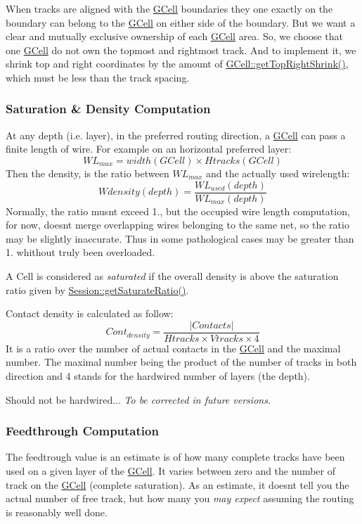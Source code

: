 When tracks are aligned with the \mbox{\hyperlink{classKatabatic_1_1GCell}{G\+Cell}} boundaries they one exactly on the boundary can belong to the \mbox{\hyperlink{classKatabatic_1_1GCell}{G\+Cell}} on either side of the boundary. But we want a clear and mutually exclusive ownership of each \mbox{\hyperlink{classKatabatic_1_1GCell}{G\+Cell}} area. So, we choose that one \mbox{\hyperlink{classKatabatic_1_1GCell}{G\+Cell}} do not own the topmost and rightmost track. And to implement it, we shrink top and right coordinates by the amount of \mbox{\hyperlink{classKatabatic_1_1GCell_ac594cb2832ee7ef410c89499258d38fd}{G\+Cell\+::get\+Top\+Right\+Shrink()}}, which must be less than the track spacing.\hypertarget{classKatabatic_1_1GCell_secGCellDensity}{}\subsubsection{Saturation \& Density Computation}\label{classKatabatic_1_1GCell_secGCellDensity}
At any depth (i.\+e. layer), in the preferred routing direction, a \mbox{\hyperlink{classKatabatic_1_1GCell}{G\+Cell}} can pass a finite length of wire. For example on an horizontal preferred layer\+: \[ WL_{max} = width(GCell) \times Htracks(GCell) \] Then the density, is the ratio between $WL_{max}$ and the actually used wirelength\+: \[ Wdensity(depth) = \frac{WL_{used}(depth)}{WL_{max}(depth)} \] Normally, the ratio musn\textquotesingle{}t exceed 1., but the occupied wire length computation, for now, doesn\textquotesingle{}t merge overlapping wires belonging to the same net, so the ratio may be slightly inaccurate. Thus in some pathological cases may be greater than 1. whithout truly been overloaded.

A Cell is considered as {\itshape saturated} if the overall density is above the saturation ratio given by \mbox{\hyperlink{classKatabatic_1_1Session_a266a4079ca235e8fdb622ef4996d324d}{Session\+::get\+Saturate\+Ratio()}}.

Contact density is calculated as follow\+: \[ Cont_{density} = \frac{|Contacts|}{Htracks \times Vtracks \times 4} \] It is a ratio over the number of actual contacts in the \mbox{\hyperlink{classKatabatic_1_1GCell}{G\+Cell}} and the maximal number. The maximal number being the product of the number of tracks in both direction and 4 stands for the hardwired number of layers (the depth).

Should not be hardwired... {\itshape To be corrected in future versions.}\hypertarget{classKatabatic_1_1GCell_secGCellFeedthrough}{}\subsubsection{Feedthrough Computation}\label{classKatabatic_1_1GCell_secGCellFeedthrough}
The feedtrough value is an estimate is of how many complete tracks have been used on a given layer of the \mbox{\hyperlink{classKatabatic_1_1GCell}{G\+Cell}}. It varies between zero and the number of track on the \mbox{\hyperlink{classKatabatic_1_1GCell}{G\+Cell}} (complete saturation). As an estimate, it doesn\textquotesingle{}t tell you the actual number of free track, but how many you {\itshape may expect} assuming the routing is reasonably well done.

